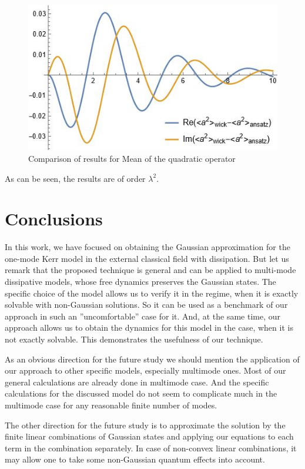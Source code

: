 \documentclass[12pt]{article}
\theoremstyle{definition}
\def\la {\lambda}
\begin{document}
\begin{figure}[h!]
\begin{center}
\begin{minipage}[h!]{0.45\linewidth}
				\includegraphics[width=1\linewidth]{Comparea2.JPG}
				\caption{Comparison of results for Mean of the quadratic operator}
				\label{fig:compa2}
			\end{minipage}
		\end{center}
	\end{figure}
	
	As can be seen, the results are of order $\la^2$.
	
	\section{Conclusions}
	In this work, we have focused on obtaining the Gaussian approximation for the one-mode Kerr model in the external classical field with dissipation. But let us remark that the proposed technique is general and can be applied to multi-mode dissipative models, whose free dynamics preserves the Gaussian states. The specific choice of the model allows us to verify it in the regime, when it is exactly solvable with non-Gaussian solutions. So it can be used as a benchmark of our approach in such an ''uncomfortable'' case for it. And, at the same time, our approach allows us to obtain the dynamics for this model in the case, when it is not exactly solvable. This demonstrates the usefulness of our technique.
	
	As an obvious direction for the future study we should mention the application of our approach to other specific models, especially  multimode ones. Most of our general calculations are already done in multimode case. And the specific calculations for the discussed model do not seem to complicate much in the multimode case for any reasonable finite number of modes. 
	
	The other direction for the future study is to approximate the solution by the finite linear combinations of Gaussian states and applying our equations to each term in the combination separately. In case of non-convex linear combinations, it may allow one to take some non-Gaussian quantum effects into account.
	
\end{document}
